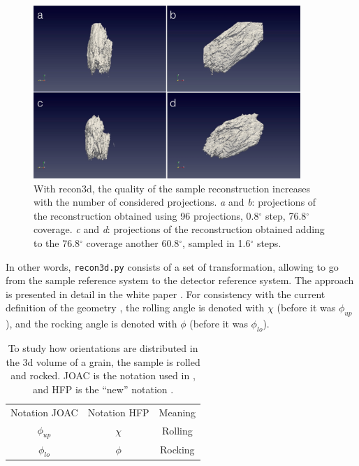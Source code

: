 \documentclass[11pt]{scrartcl}
\begin{document}
\begin{figure}[h]
    \centering
    \includegraphics[width=0.9\textwidth]{recon3d_different_ranges.png}
    \caption{With recon3d, the quality of the sample reconstruction increases with the number of considered projections. {\emph{a}} and {\emph{b}}: projections of the reconstruction obtained using 96 projections, 0.8$^{\circ}$ step, 76.8$^{\circ}$ coverage. {\emph{c}} and {\emph{d}}: projections of the reconstruction obtained adding to the 76.8$^{\circ}$ coverage another 60.8$^{\circ}$, sampled in 1.6$^{\circ}$ steps.}
    \label{fig:recon3d_different_ranges}
\end{figure}

In other words, {\texttt{recon3d.py}} consists of a set of transformation, allowing to go from the sample reference system to the detector reference system. The approach is presented in detail in the white paper \cite{report_jette_anders}. For consistency with the current definition of the geometry \cite{henning_joac}, the rolling angle is denoted with $\chi$ (before it was $\phi_{up}$), and the rocking angle is denoted with $\phi$ (before it was $\phi_{lo}$).

\begin{table}
    \begin{center}
    \begin{tabular}{ c c c }
        Notation {\footnotesize{JOAC}} & Notation {\footnotesize{HFP}} & Meaning \\
        $\phi_{up}$ & $\chi$ & Rolling \\
        $\phi_{lo}$ & $\phi$ & Rocking \\
    \end{tabular}
    \end{center}
    \caption{To study how orientations are distributed in the 3d volume of a grain, the sample is rolled and rocked. {\footnotesize{JOAC}} is the notation used in \cite{report_jette_anders}, and {\footnotesize{HFP}} is the ``new'' notation \cite{henning_joac}.}
    \label{tab:angles}
\end{table}
\end{document}

